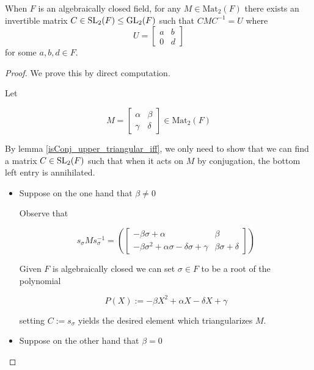 \begin{lemma}
\label{isTriangularizable_of_algClosed}
\leanok
    When $F$ is an algebraically closed field, 
    for any $M \in \textrm{Mat}_2(F)$ there exists an invertible matrix $C \in \operatorname{SL}_2(F) \le \operatorname{GL}_2(F)$ such that $C M C^{-1} = U$ where
    \[
    U = \begin{bmatrix}
        a & b\\
        0 & d
    \end{bmatrix}\] for some $a, b, d \in F$.
\end{lemma}
\begin{proof}
    \leanok
We prove this by direct computation. 

Let 

\[
M = \begin{bmatrix}
\alpha & \beta\\
\gamma & \delta
\end{bmatrix} \in \textrm{Mat}_2(F)
\]

By lemma \ref{isConj_upper_triangular_iff}, we only need to show that we can find a matrix $C \in \operatorname{SL}_2(F)$ such that when it acts on $M$ by conjugation, the bottom left entry is annihilated.

\begin{itemize}
    \item Suppose on the one hand that $\beta \ne 0$
    
    Observe that 
    
    \begin{equation}\label{triang}
        s_\sigma M s_\sigma^{-1} = \left(\begin{bmatrix}
            -\beta \sigma + \alpha & \beta \\
            -\beta \sigma^{2} + \alpha \sigma - \delta \sigma + \gamma & \beta \sigma + \delta
            \end{bmatrix}\right)
    \end{equation}

    Given $F$ is algebraically closed we can set $\sigma \in F$ to be a root of the polynomial

    \[
    P(X) := -\beta X^{2} + \alpha X - \delta X + \gamma 
    \]

    setting $C := s_\sigma$ yields the desired element which triangularizes $M$.
    

    \item Suppose on the other hand that $\beta = 0$
    

\end{itemize}
\end{proof}
